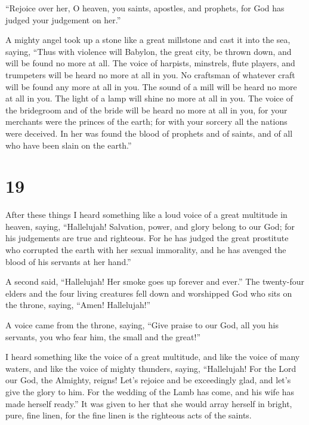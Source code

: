  ``Rejoice over her, O heaven, you saints, apostles, and
prophets, for God has judged your judgement on her.''

 A mighty angel took up a stone like a great millstone and
cast it into the sea, saying, ``Thus with violence will Babylon, the
great city, be thrown down, and will be found no more at all.
 The voice of harpists, minstrels, flute players, and
trumpeters will be heard no more at all in you. No craftsman of whatever
craft will be found any more at all in you. The sound of a mill will be
heard no more at all in you.  The light of a lamp will
shine no more at all in you. The voice of the bridegroom and of the
bride will be heard no more at all in you, for your merchants were the
princes of the earth; for with your sorcery all the nations were
deceived.  In her was found the blood of prophets and of
saints, and of all who have been slain on the earth.''

\hypertarget{section-18}{%
\section{19}\label{section-18}}

 After these things I heard something like a loud voice of a
great multitude in heaven, saying, ``Hallelujah! Salvation, power, and
glory belong to our God;  for his judgements are true and
righteous. For he has judged the great prostitute who corrupted the
earth with her sexual immorality, and he has avenged the blood of his
servants at her hand.''

 A second said, ``Hallelujah! Her smoke goes up forever and
ever.''  The twenty-four elders and the four living
creatures fell down and worshipped God who sits on the throne, saying,
``Amen! Hallelujah!''

 A voice came from the throne, saying, ``Give praise to our
God, all you his servants, you who fear him, the small and the great!''

 I heard something like the voice of a great multitude, and
like the voice of many waters, and like the voice of mighty thunders,
saying, ``Hallelujah! For the Lord our God, the Almighty, reigns!
 Let's rejoice and be exceedingly glad, and let's give the
glory to him. For the wedding of the Lamb has come, and his wife has
made herself ready.''  It was given to her that she would
array herself in bright, pure, fine linen, for the fine linen is the
righteous acts of the saints.

